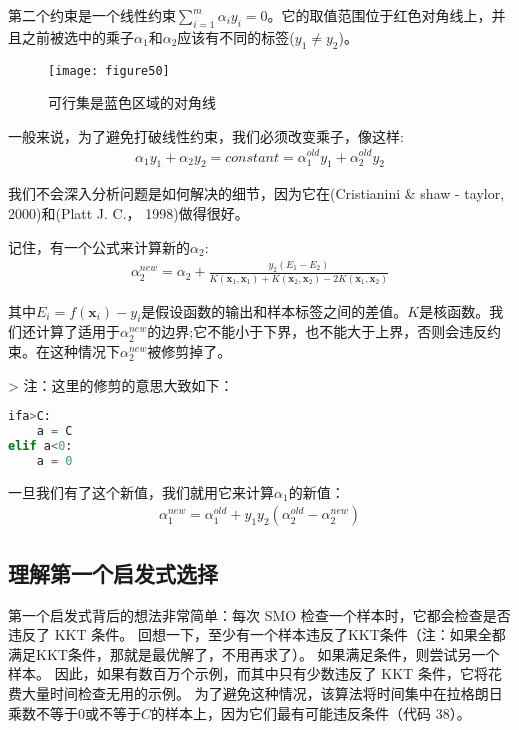 第二个约束是一个线性约束$\sum\limits_{i=1}^m \alpha_i y_i = 0$。它的取值范围位于红色对角线上，并且之前被选中的乘子$\alpha_1$和$\alpha_2$应该有不同的标签($y_1 \neq y_2$)。

\begin{figure}[ht]
	\centering
	\texttt{[image: figure50]}
	\caption{可行集是蓝色区域的对角线}
	\label{figure50}
\end{figure}

一般来说，为了避免打破线性约束，我们必须改变乘子，像这样:
\begin{gather*}
\alpha_1 y_1 + \alpha_2 y_2 = constant = \alpha_1^{old} y_1 + \alpha_2^{old} y_2
\end{gather*}

我们不会深入分析问题是如何解决的细节，因为它在(Cristianini \& shaw - taylor, 2000)和(Platt J. C.， 1998)做得很好。

记住，有一个公式来计算新的$\alpha_2$:
\begin{gather*}
\alpha_2^{new} = \alpha_2 + \frac{y_2(E_1-E_2)}{K(\mathbf{x}_1,\mathbf{x}_1)+K(\mathbf{x}_2,\mathbf{x}_2)-2K(\mathbf{x}_1,\mathbf{x}_2)}
\end{gather*}

其中$E_i = f(\mathbf{x}_i)-y_i$是假设函数的输出和样本标签之间的差值。$K$是核函数。我们还计算了适用于$\alpha_2^{new}$的边界;它不能小于下界，也不能大于上界，否则会违反约束。在这种情况下$\alpha_2^{new}$被修剪掉了。

> 注：这里的修剪的意思大致如下： 
\begin{lstlisting}[language=python]
ifa>C:
    a = C
elif a<0:
    a = 0
\end{lstlisting}

一旦我们有了这个新值，我们就用它来计算$\alpha_1$的新值：
\begin{gather*}
\alpha_1^{new} = \alpha_1^{old}+y_1 y_2 (\alpha_2^{old}-\alpha_2^{new})
\end{gather*}

\subsection{理解第一个启发式选择}

第一个启发式背后的想法非常简单：每次 SMO 检查一个样本时，它都会检查是否违反了 KKT 条件。 回想一下，至少有一个样本违反了KKT条件（注：如果全都满足KKT条件，那就是最优解了，不用再求了）。 如果满足条件，则尝试另一个样本。 因此，如果有数百万个示例，而其中只有少数违反了 KKT 条件，它将花费大量时间检查无用的示例。 为了避免这种情况，该算法将时间集中在拉格朗日乘数不等于$0$或不等于$C$的样本上，因为它们最有可能违反条件（代码 38）。

